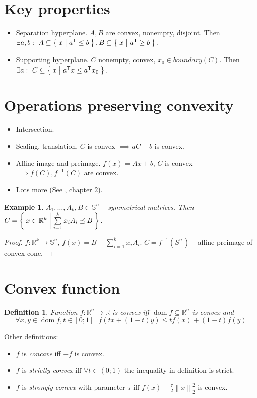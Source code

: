 \documentclass[10pt]{article}
\newtheorem{definition}[def]{Definition}
\newtheorem{example}[ex]{Example}
\newcommand{\R}{\mathbb{R}}
\newcommand{\norm}[1]{\left\lVert #1 \right\rVert}
\newcommand{\Rn}{\R^n}
\newcommand{\sumi}[2]{\sum\limits_{#1=1}^{#2}}
\newcommand{\TODO}[1]{\textbf{\color{red} TODO: #1}}
\newcommand{\trans}[1]{{#1}^\mathsf{T}}
\newcommand{\Sym}{\mathbb{S}^n}
\DeclareMathOperator*{\dom}{dom}
\begin{document}
\section{Key properties}
\begin{itemize}
  \item Separation hyperplane. $A, B$ are convex, nonempty, disjoint. Then
    $\exists a,b:\ A \subseteq \Set{x | \trans a \leq b}, B \subseteq \Set{x | \trans a \geq b}$.
  \item Supporting hyperplane. $C$ nonempty, convex, $x_0 \in boundary(C)$. Then
    $\exists a:\ C \subseteq \Set{x | \trans a x \leq \trans a x_0}$.
\end{itemize}


\section{Operations preserving convexity}
\begin{itemize}
  \item Intersection.
  \item Scaling, translation. $C$ is convex $\implies a C + b$ is convex.
  \item Affine image and preimage. $f(x) = A x + b$, $C$ is convex $\implies f(C), f^{-1}(C)$ are convex.
  \item Lots more (See \cite{boyd2004convex}, chapter $2$).
\end{itemize}

\begin{example}
  $A_1, \ldots, A_k, B \in \Sym$ -- symmetrical matrices.
  Then $C = \Set{x \in \R^k | \sumi ik x_i A_i \preceq B}$.
\end{example}
\begin{proof}
  $f: \R^k \to \Sym$, $f(x) = B - \sumi i k x_i A_i$.
  $C = f^{-1}(S_+^n)$ -- affine preimage of convex cone.
\end{proof}

\section{Convex function}

\begin{definition}
  Function $f: \Rn \to \R$ is \emph{convex} iff $\dom f \subseteq \Rn$ is convex and
    \[\forall x,y \in \dom f, t \in [0;1] \ \ \ f(t x + (1-t) y) \leq t f(x) + (1-t) f(y)\]
\end{definition}

Other definitions:
\begin{itemize}
  \item $f$ is \emph{concave} iff $-f$ is convex.
  \item $f$ is \emph{strictly convex} iff $\forall t \in (0; 1)$ the inequality in definition is strict.
  \item $f$ is \emph{strongly convex} with parameter $\tau$
    iff $f(x) - \frac \tau 2 \norm x_2^2$ is convex.
\end{itemize}
\end{document}

